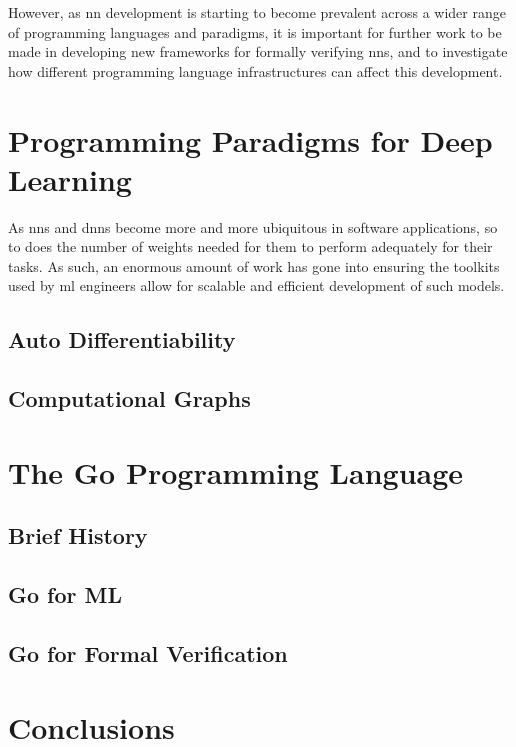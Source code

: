 However, as \gls{nn} development is starting to become prevalent across a wider range of programming languages and
paradigms, it is important for further work to be made in developing new frameworks for formally verifying \glspl{nn}, and to 
investigate how different programming language infrastructures can affect this development.

\section{Programming Paradigms for Deep Learning}\label{section:paradigms}

As \glspl{nn} and \glspl{dnn} become more and more ubiquitous in software applications, so to does
the number of weights needed for them to perform adequately for their tasks. As such, an enormous amount
of work has gone into ensuring the toolkits used by \gls{ml} engineers allow for scalable and efficient development
of such models.

\subsection{Auto Differentiability}

\subsection{Computational Graphs}

\section{The Go Programming Language}

\subsection{Brief History}
\subsection{Go for ML}
\subsection{Go for Formal Verification}

\section{Conclusions}
